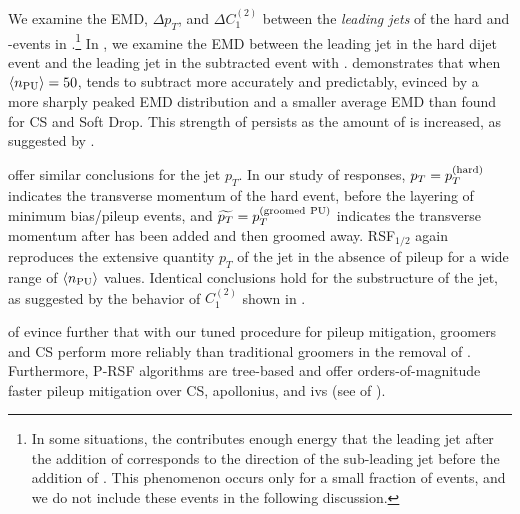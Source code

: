 We examine the EMD, \(\Delta p_T\), and \(\Delta C_1^{(2)}\) between the \textit{leading jets} of the hard and -events in .\footnote{
In some situations, the  contributes enough energy that the leading jet after the addition of  corresponds to the direction of the sub-leading jet before the addition of .
%
This phenomenon occurs only for a small fraction of events, and we do not include these events in the following discussion.
}
%
In , we examine the EMD between the leading jet in the hard dijet event and the leading jet in the subtracted event with .
%
 demonstrates that when \(\langle n_{\rm PU} \rangle=50\),  tends to subtract  more accurately and predictably, evinced by a more sharply peaked EMD distribution and a smaller average  EMD than found for CS and Soft Drop.
%
This strength of  persists as the amount of  is increased, as suggested by .

 offer similar conclusions for the jet \(p_T\).
%
In our study of  responses, \(p_T = p_T^{\rm(hard)}\) indicates the transverse momentum of the hard event, before the layering of minimum bias/pileup events, and \(\widetilde{p_T} = p_T^{\rm (groomed~PU)}\) indicates the transverse momentum after  has been added and then groomed away.
%
RSF\(_{1/2}\) again reproduces the extensive quantity \(p_T\) of the jet in the absence of \gls{pileup} for a wide range of \(\langle n_{\rm PU} \rangle\) values.
%
Identical conclusions hold for the substructure of the jet, as suggested by the behavior of \(C_1^{(2)}\) shown in .

 of  evince further that with our tuned procedure for \gls{pileup} mitigation, \PIRANHA{} groomers and CS perform more reliably than traditional groomers in the removal of .
%
Furthermore, P-RSF algorithms are tree-based and offer orders-of-magnitude faster \gls{pileup} mitigation over CS, \gls{apollonius}, and \gls{ivs} (see  of ).


